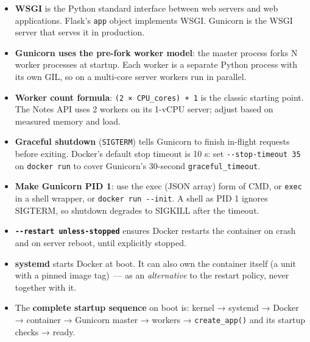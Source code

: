 \label{24-process-startup:key-takeaways}
\begin{takeaways}

\begin{itemize}
\tightlist
\item
  \textbf{WSGI} is the Python standard interface between web servers and web applications. Flask's \texttt{app} object implements WSGI. Gunicorn is the WSGI server that serves it in production.
\item
  \textbf{Gunicorn uses the pre-fork worker model}: the master process forks N worker processes at startup. Each worker is a separate Python process with its own GIL, so on a multi-core server workers run in parallel.
\item
  \textbf{Worker count formula}: \texttt{(2\ ×\ CPU\_cores)\ +\ 1} is the classic starting point. The Notes API uses 2 workers on its 1-vCPU server; adjust based on measured memory and load.
\item
  \textbf{Graceful shutdown} (\texttt{SIGTERM}) tells Gunicorn to finish in-flight requests before exiting. Docker's default stop timeout is 10 s: set \texttt{-\/-stop-timeout\ 35} on \texttt{docker\ run} to cover Gunicorn's 30-second \texttt{graceful\_timeout}.
\item
  \textbf{Make Gunicorn PID 1}: use the exec (JSON array) form of CMD, or \texttt{exec} in a shell wrapper, or \texttt{docker\ run\ -\/-init}. A shell as PID 1 ignores SIGTERM, so shutdown degrades to SIGKILL after the timeout.
\item
  \textbf{\texttt{-}\allowbreak{}\texttt{-}\allowbreak{}\texttt{restart\ unless-}\allowbreak{}\texttt{stopped}} ensures Docker restarts the container on crash and on server reboot, until explicitly stopped.
\item
  \textbf{systemd} starts Docker at boot. It can also own the container itself (a unit with a pinned image tag)~--- as an \emph{alternative} to the restart policy, never together with it.
\item
  The \textbf{complete startup sequence} on boot is: kernel → systemd → Docker → container → Gunicorn master → workers → \texttt{create\_app()} and its startup checks → ready.
\end{itemize}

\end{takeaways}

\label{24-process-startup:exercises}

